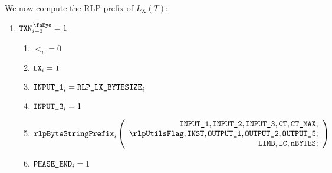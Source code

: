 We now compute the RLP prefix of $L _{\mathrm{X}}(T)$:
\begin{enumerate}[resume]
	\item \If $\isTxn _{i-3}=1$ \Then
		\begin{enumerate}
			\item $\lt _{i}=0$
			\item $\texttt{LX} _{i}=1$
			\item $\texttt{INPUT\_1} _{i} = \texttt{RLP\_LX\_BYTESIZE} _{i}$
			\item $\texttt{INPUT\_3} _{i} = 1$ 
			\item 
				\[
					\rlpBytestringPrefix _{i}
					\left(
					\begin{array}{r}
						\inputColumn{1},
						\inputColumn{2},
						\inputColumn{3},
						\ct,
						\maxCt; \\
						\rlpUtilsFlag,
						\INST,
						\outputColumn{1},
						\outputColumn{2},
						\outputColumn{5}; \\
						\limb,
						\lc,
						\limbsize; \\
					\end{array}
					\right)
				\]
			\item \If $\texttt{PHASE\_END} _{i}=1$
		\end{enumerate}
\end{enumerate}

